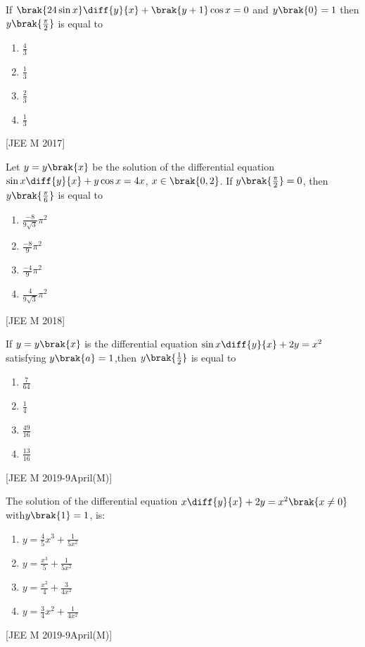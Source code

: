 \item If $ \brak{24 \sin{x}}\diff{y}{x}+ \brak{y+1}\cos{x}=0$ and $y\brak{0}=1$ then $y\brak{\frac{\pi}{2}}$ is equal to
\begin{multicols}{2}
 \begin{enumerate}
    \item $\frac{4}{3}$
    \item $\frac{1}{3}$
    \item $\frac{2}{3}$
    \item $\frac{1}{3}$
    
 \end{enumerate}
\end{multicols}
\hfill
{[JEE M 2017]}


\item Let $ y=y\brak{x}$ be the solution of the differential equation $\sin{x}\diff{y}{x}+y\cos{x}=4x$, $x\in\brak{0,2}$. If $y\brak{\frac{\pi}{2}}=0$, then $y\brak{\frac{\pi}{6}}$ is equal to
\begin{multicols}{2}
 \begin{enumerate}
    \item $ \frac{-8}{9\sqrt{3}}\pi^2$
    \item $ \frac{-8}{9}\pi^2$
    \item $\frac{-4}{9}\pi^2$
    \item $ \frac{4}{9\sqrt{3}}\pi^2 $
 \end{enumerate}
\end{multicols}
\hfill
{[JEE M 2018]}
\item If $ y=y\brak{x}$ is the differential equation $ \sin{x}\diff{y}{x}+2y=x^2$ satisfying $y\brak{a}=1$,then $y\brak{\frac{1}{2}}$ is equal to
\begin{multicols}{2}
 \begin{enumerate}
    \item $ \frac{7}{64}$

    
    \item $ \frac{1}{4}$

    
    \item $ \frac{49}{16}$
    
    \item $ \frac{13}{16}$
    
    
 \end{enumerate}
\end{multicols}
\hfill
{[JEE M 2019-9April(M)]}
\item The solution of the differential equation $ x\diff{y}{x}+2y=x^2 \brak{x\neq0}$with$ y\brak{1}=1$, is:
\begin{multicols}{2}
 \begin{enumerate}
    \item $ y=\frac{4}{5}x^3+\frac{1}{5x^2}$

    \item $ y=\frac{x^3}{5}+\frac{1}{5x^2}$
    \item $ y=\frac{x^2}{4}+\frac{3}{4x^2}$
    \item $ y=\frac{3}{4}x^2+\frac{1}{4x^2}$
  \end{enumerate}
\end{multicols}
\hfill
{[JEE M 2019-9April(M)]}


